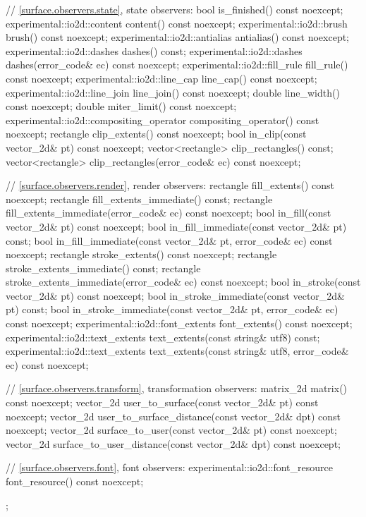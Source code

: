 \begin{codeblock}
{{{{{    // \ref{surface.observers.state}, state observers:
    bool is_finished() const noexcept;
    experimental::io2d::content content() const noexcept;
    experimental::io2d::brush brush() const noexcept;
    experimental::io2d::antialias antialias() const noexcept;
    experimental::io2d::dashes dashes() const;
    experimental::io2d::dashes dashes(error_code& ec) const noexcept;
    experimental::io2d::fill_rule fill_rule() const noexcept;
    experimental::io2d::line_cap line_cap() const noexcept;
    experimental::io2d::line_join line_join() const noexcept;
    double line_width() const noexcept;
    double miter_limit() const noexcept;
    experimental::io2d::compositing_operator compositing_operator() const
      noexcept;
    rectangle clip_extents() const noexcept;
    bool in_clip(const vector_2d& pt) const noexcept;
    vector<rectangle> clip_rectangles() const;
    vector<rectangle> clip_rectangles(error_code& ec) const noexcept;
    
    // \ref{surface.observers.render}, render observers:
    rectangle fill_extents() const noexcept;
    rectangle fill_extents_immediate() const;
    rectangle fill_extents_immediate(error_code& ec) const noexcept;
    bool in_fill(const vector_2d& pt) const noexcept;
    bool in_fill_immediate(const vector_2d& pt) const;
    bool in_fill_immediate(const vector_2d& pt, error_code& ec) const noexcept;
    rectangle stroke_extents() const noexcept;
    rectangle stroke_extents_immediate() const;
    rectangle stroke_extents_immediate(error_code& ec) const noexcept;
    bool in_stroke(const vector_2d& pt) const noexcept;
    bool in_stroke_immediate(const vector_2d& pt) const;
    bool in_stroke_immediate(const vector_2d& pt, error_code& ec) const 
      noexcept;
    experimental::io2d::font_extents font_extents() const noexcept;
    experimental::io2d::text_extents text_extents(const string& utf8) const;
    experimental::io2d::text_extents text_extents(const string& utf8,
      error_code& ec) const noexcept;
    
    // \ref{surface.observers.transform}, transformation observers:
    matrix_2d matrix() const noexcept;
    vector_2d user_to_surface(const vector_2d& pt) const noexcept;
    vector_2d user_to_surface_distance(const vector_2d& dpt) const noexcept;
    vector_2d surface_to_user(const vector_2d& pt) const noexcept;
    vector_2d surface_to_user_distance(const vector_2d& dpt) const noexcept;
    
    // \ref{surface.observers.font}, font observers:
    experimental::io2d::font_resource font_resource() const noexcept;
  };
} } } }
\end{codeblock}


